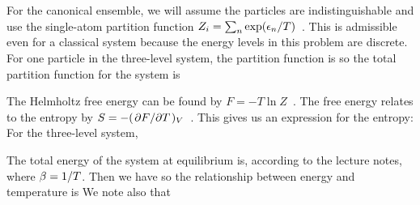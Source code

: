 {	For the canonical ensemble, we will assume the particles are indistinguishable and use the single-atom partition function $Z_i = \sum_n \exp(\epsilon_n / T)$~\cite[p.~87]{Landau}.  This is admissible even for a classical system because the energy levels in this problem are discrete.  For one particle in the three-level system, the partition function is
	so the total partition function for the system is
	
	The Helmholtz free energy can be found by $F = -T \ln Z$~\cite[p.~87]{Landau}.  The free energy relates to the entropy by ${S = -(\pdv*{F}{T})_V}$~\cite[p.~47]{Landau}.  This gives us an expression for the entropy:
	For the three-level system,
	
	The total energy of the system at equilibrium is, according to the lecture notes,
	where $\beta = 1 / T$.  Then we have
	so the relationship between energy and temperature is
	We note also that
	
}
